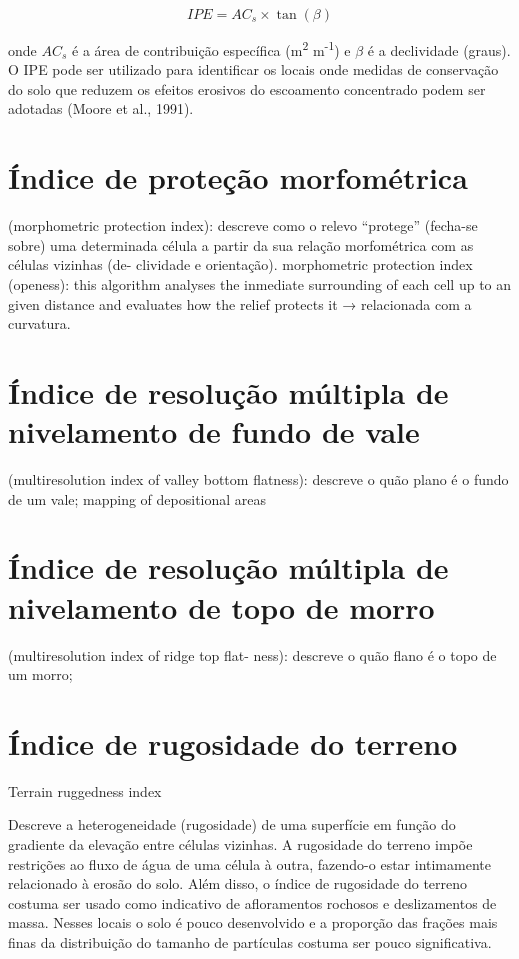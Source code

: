 \documentclass[]{book}
\begin{document}
\[IPE = AC_s \times \tan(\beta)\]

onde \(AC_s\) é a área de contribuição específica (m\textsuperscript{2}
m\textsuperscript{-1}) e \(\beta\) é a declividade (graus). O IPE pode
ser utilizado para identificar os locais onde medidas de conservação do
solo que reduzem os efeitos erosivos do escoamento concentrado podem ser
adotadas (Moore et al., 1991).

\section{Índice de proteção
morfométrica}\label{indice-de-protecao-morfometrica}

(morphometric protection index): descreve como o relevo ``protege''
(fecha-se sobre) uma determinada célula a partir da sua relação
morfométrica com as células vizinhas (de- clividade e orientação).
morphometric protection index (openess): this algorithm analyses the
inmediate surrounding of each cell up to an given distance and evaluates
how the relief protects it → relacionada com a curvatura.

\section{Índice de resolução múltipla de nivelamento de fundo de
vale}\label{indice-de-resolucao-multipla-de-nivelamento-de-fundo-de-vale}

(multiresolution index of valley bottom ﬂatness): descreve o quão plano
é o fundo de um vale; mapping of depositional areas

\section{Índice de resolução múltipla de nivelamento de topo de
morro}\label{indice-de-resolucao-multipla-de-nivelamento-de-topo-de-morro}

(multiresolution index of ridge top ﬂat- ness): descreve o quão ﬂano é o
topo de um morro;

\section{Índice de rugosidade do
terreno}\label{indice-de-rugosidade-do-terreno}

Terrain ruggedness index

Descreve a heterogeneidade (rugosidade) de uma superfície em função do
gradiente da elevação entre células vizinhas. A rugosidade do terreno
impõe restrições ao fluxo de água de uma célula à outra, fazendo-o estar
intimamente relacionado à erosão do solo. Além disso, o índice de
rugosidade do terreno costuma ser usado como indicativo de afloramentos
rochosos e deslizamentos de massa. Nesses locais o solo é pouco
desenvolvido e a proporção das frações mais finas da distribuição do
tamanho de partículas costuma ser pouco significativa.
\end{document}
